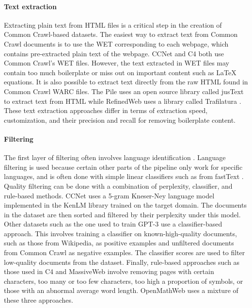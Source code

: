 \paragraph{Text extraction}
Extracting plain text from HTML files is a critical step in the creation of Common Crawl-based datasets. The easiest way to extract text from Common Crawl documents is to use the WET corresponding to each webpage, which contains pre-extracted plain text of the webpage. CCNet and C4 both use Common Crawl's WET files. However, the text extracted in WET files may contain too much boilerplate or miss out on important content such as \LaTeX{} equations. It is also possible to extract text directly from the raw HTML found in Common Crawl WARC files. The Pile uses an open source library called jusText \citep{justext} to extract text from HTML while RefinedWeb uses a library called Trafilatura \citep{barbaresi-2021-trafilatura}. These text extraction approaches differ in terms of extraction speed, customization, and their precision and recall for removing boilerplate content.

\paragraph{Filtering} 
The first layer of filtering often involves language identification \citep{wenzek2019ccnet}. Language filtering is used because certain other parts of the pipeline only work for specific languages, and is often done with simple linear classifiers such as from fastText \citep{joulin2016fasttext}. Quality filtering can be done with a combination of perplexity, classifier, and rule-based methods. CCNet uses a 5-gram Kneser-Ney language model implemented in the KenLM library \citep{heafield2011kenlm} trained on the target domain. The documents in the dataset are then sorted and filtered by their perplexity under this model. Other datasets such as the one used to train GPT-3 \citep{gpt3} use a classifier-based approach. This involves training a classifier on known-high-quality documents, such as those from Wikipedia, as positive examples and unfiltered documents from Common Crawl as negative examples. The classifier scores are used to filter low-quality documents from the dataset. Finally, rule-based approaches such as those used in C4 \citep{raffel2020exploring} and MassiveWeb \citep{gopher} involve removing pages with certain characters, too many or too few characters, too high a proportion of symbols, or those with an abnormal average word length. OpenMathWeb uses a mixture of these three approaches.

